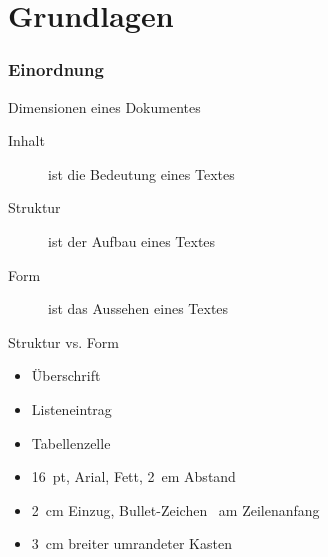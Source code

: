 \chapter{Grundlagen}


\website


\subsection{Einordnung}

\begin{Frame}{Dimensionen eines Dokumentes}
  \begin{description}
    \item[Inhalt] ist die \alert{Bedeutung} eines Textes
    \item[Struktur] ist der \alert{Aufbau} eines Textes
    \item[Form] ist das \alert{Aussehen} eines Textes
  \end{description}
\end{Frame}

\begin{Frame}{Struktur vs. Form}
  \begin{Beispiel}[Strukturelemente]
    \begin{itemize}
      \item Überschrift
      \item Listeneintrag
      \item Tabellenzelle
    \end{itemize}
  \end{Beispiel}

  \xxx

  \begin{Beispiel}[Formen]
    \begin{itemize}
      \item 16~pt, Arial, Fett, 2~em Abstand
      \item 2~cm Einzug, Bullet-Zeichen \textbullet\ am Zeilenanfang
      \item 3~cm breiter umrandeter Kasten
    \end{itemize}
  \end{Beispiel}
\end{Frame}


